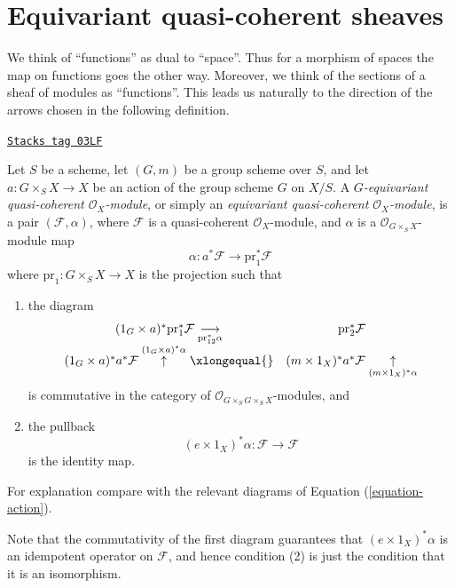 \section{Equivariant quasi-coherent sheaves}
\label{groupoids-section-equivariant}
We think of ``functions'' as dual to ``space''. Thus for a morphism of spaces
the map on functions goes the other way. Moreover, we think of the
sections of a sheaf of modules as ``functions''. This leads us naturally
to the direction of the arrows chosen in the following definition.

\begin{definition}
\label{groupoids-definition-equivariant-module}
\href{https://stacks.math.columbia.edu/tag/03LF}{\texttt{Stacks tag 03LF}}

Let $S$ be a scheme, let $(G, m)$ be a group scheme over $S$, and
let $a : G \times_S X \to X$ be an action of the group scheme $G$
on $X/S$. A {\it $G$-equivariant quasi-coherent $\mathcal{O}_X$-module},
or simply an {\it equivariant quasi-coherent $\mathcal{O}_X$-module},
is a pair $(\mathcal{F}, \alpha)$, where $\mathcal{F}$ is a quasi-coherent
$\mathcal{O}_X$-module, and $\alpha$ is a $\mathcal{O}_{G \times_S X}$-module
map
$$
\alpha : a^*\mathcal{F} \longrightarrow \text{pr}_1^*\mathcal{F}
$$
where $\text{pr}_1 : G \times_S X \to X$ is the projection
such that
\begin{enumerate}
\item the diagram
$$
\begin{array}{cc}(1_G \times a)^*\text{pr}_1^*\mathcal{F} \underset{\text{pr}_{12}^*\alpha}{\longrightarrow} & \text{pr}_2^*\mathcal{F} \\ (1_G \times a)^*a^*\mathcal{F} \overset{(1_G \times a)^*\alpha}{\uparrow}\xlongequal{} & (m \times 1_X)^*a^*\mathcal{F} \underset{(m \times 1_X)^*\alpha}{\uparrow}\end{array}
$$
is commutative in the category of
$\mathcal{O}_{G \times_S G \times_S X}$-modules, and
\item the pullback
$$
(e \times 1_X)^*\alpha : \mathcal{F} \longrightarrow \mathcal{F}
$$
is the identity map.
\end{enumerate}
For explanation compare with the relevant diagrams of
Equation (\ref{equation-action}).
\end{definition}

Note that the commutativity of the first diagram guarantees that
$(e \times 1_X)^*\alpha$ is an idempotent operator on $\mathcal{F}$,
and hence condition (2) is just the condition that it is an isomorphism.

